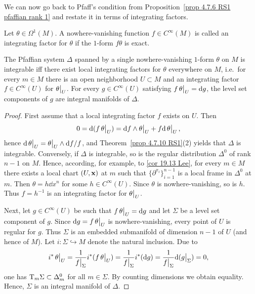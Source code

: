 We can now go back to Pfaff's condition from Proposition~\ref{prop 4.7.6 RS1 pfaffian rank 1} and restate it in terms of integrating factors.

\begin{defn}
    Let $\theta\in\Omega^1(M)$. A nowhere-vanishing function $f\in C^\infty(M)$ is called an integrating factor for $\theta$ if the $1$-form $f\theta$ is exact.
\end{defn}

\begin{prop}[{{\cite[Prop.~4.7.13]{RS1}}}]\label{prop 4.7.13 RS1}
    The Pfaffian system $\Delta$ spanned by a single nowhere-vanishing $1$-form $\theta$ on $M$ is integrable iff there exist local integrating factors for $\theta$ everywhere on $M$, i.e.~for every $m\in M$ there is an open neighborhood $U\subset M$ and an integrating factor $f\in C^\infty(U)$ for $\restr{\theta}{U}$. For every $g\in C^\infty(U)$ satisfying $f\restr{\theta}{U}=\dd g$, the level set components of $g$ are integral manifolds of $\Delta$.
\end{prop}
\begin{proof}
    First assume that a local integrating factor $f$ exists on $U$. Then 
    \[0=\dd(f\restr{\theta}{U})=\dd f\wedge\restr{\theta}{U}+f\dd\restr{\theta}{U},\]
    hence $\dd\restr{\theta}{U}=\restr{\theta}{U}\wedge \dd f/f$, and Theorem~\ref{prop 4.7.10 RS1}(2) yields that $\Delta$ is integrable. Conversely, if $\Delta$ is integrable, so is the regular distribution $\Delta^0$ of rank $n-1$ on $M$. Hence, according, for example, to \ref{cor 19.13 Lee}, for every $m\in M$ there exists a local chart $(U,\bf{x})$ at $m$ such that $\{\partial^{x_i}\}_{i=1}^{n-1}$ is a local frame in $\Delta^0$ at $m$. Then $\theta=h\dd x^n$ for some $h\in C^\infty(U)$. Since $\theta$ is nowhere-vanishing, so is $h$. Thus $f=h^{-1}$ is an integrating factor for $\restr{\theta}{U}$.

    Next, let $g\in C^\infty(U)$ be such that $f\restr{\theta}{U}=\dd g$ and let $\Sigma$ be a level set component of $g$. Since $\dd g=f\restr{\theta}{U}$ is nowhere-vanishing, every point of $U$ is regular for $g$. Thus $\Sigma$ is an embedded submanifold of dimension $n-1$ of $U$ (and hence of $M$). Let $i:\Sigma\hookrightarrow M$ denote the natural inclusion. Due to
    \[i^\ast\restr{\theta}{U}=\frac{1}{\restr{f}{\Sigma}}i^\ast(f\restr{\theta}{U})=\frac{1}{\restr{f}{\Sigma}}i^\ast(\dd g)=\frac{1}{\restr{f}{\Sigma}}\dd(\restr{g}{\Sigma})=0, \]
    one has $\T_m\Sigma\subset\Delta_m^0$ for all $m\in\Sigma$. By counting dimensions we obtain equality. Hence, $\Sigma$ is an integral manifold of $\Delta$.
\end{proof}


